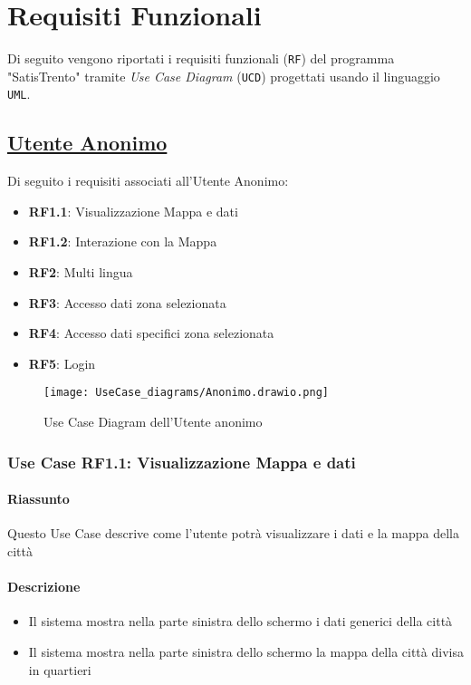 \chapter{Requisiti Funzionali}
\label{ch:requisitiFunzionali}

Di seguito vengono riportati i requisiti funzionali (\texttt{RF}) del programma "SatisTrento" tramite \textit{Use Case Diagram} (\texttt{UCD}) progettati usando il linguaggio \texttt{UML}.

\section{\underline{Utente Anonimo}}
    Di seguito i requisiti associati all'Utente Anonimo:
    \begin{itemize}
        \item \textbf{RF1.1}: Visualizzazione Mappa e dati
        \item \textbf{RF1.2}: Interazione con la Mappa
        \item \textbf{RF2}: Multi lingua
        \item \textbf{RF3}: Accesso dati zona selezionata
        \item \textbf{RF4}: Accesso dati specifici zona selezionata
        \item \textbf{RF5}: Login
    \end{itemize}
    \begin{figure}[H]
        \centering
        \texttt{[image: UseCase\_diagrams/Anonimo.drawio.png]}
        \caption{Use Case Diagram dell'Utente anonimo}
    \end{figure}

    \subsection{Use Case RF1.1: Visualizzazione Mappa e dati}
        \subsubsection{Riassunto}
            Questo Use Case descrive come l'utente potrà visualizzare i dati e la mappa della città
        \subsubsection{Descrizione}
            \begin{itemize}
                \item Il sistema mostra nella parte sinistra dello schermo i dati generici della città
                \item Il sistema mostra nella parte sinistra dello schermo la mappa della città divisa in quartieri
            \end{itemize}
    
